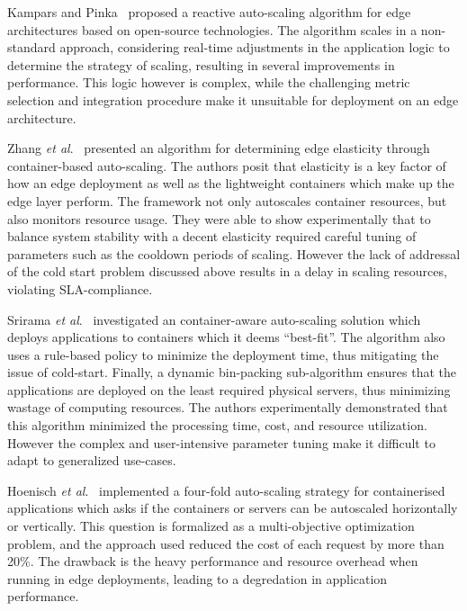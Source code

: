 Kampars and Pinka~\cite{kampars2017auto} proposed a reactive auto-scaling algorithm for edge architectures based on open-source technologies. The algorithm scales in a non-standard approach, considering real-time adjustments in the application logic to determine the strategy of scaling, resulting in several improvements in performance. This logic however is complex, while the challenging metric selection and integration procedure make it unsuitable for deployment on an edge architecture.\par

Zhang \textit{et al}.~\cite{zhang2019quantifying} presented an algorithm for determining edge elasticity through container-based auto-scaling. The authors posit that elasticity is a key factor of how an edge deployment as well as the lightweight containers which make up the edge layer perform. The framework not only autoscales container resources, but also monitors resource usage. They were able to show experimentally that to balance system stability with a decent elasticity required careful tuning of parameters such as the cooldown periods of scaling. However the lack of addressal of the cold start problem discussed above results in a delay in scaling resources, violating SLA-compliance.\par

Srirama \textit{et al}.~\cite{srirama2020application} investigated an container-aware auto-scaling solution which deploys applications to containers which it deems ``best-fit''. The algorithm also uses a rule-based policy to minimize the deployment time, thus mitigating the issue of cold-start. Finally, a dynamic bin-packing sub-algorithm ensures that the applications are deployed on the least required physical servers, thus minimizing wastage of computing resources. The authors experimentally demonstrated that this algorithm minimized  the processing time, cost, and resource utilization. However the complex and user-intensive parameter tuning make it difficult to adapt to generalized use-cases.\par

Hoenisch \textit{et al}.~\cite{hoenisch2015four} implemented a four-fold auto-scaling strategy for containerised applications which asks if the containers or servers can be autoscaled horizontally or vertically. This question is formalized as a multi-objective optimization problem, and the approach used reduced the cost of each request by more than 20\%. The drawback is the heavy performance and resource overhead when running in edge deployments, leading to a degredation in application performance.\par

